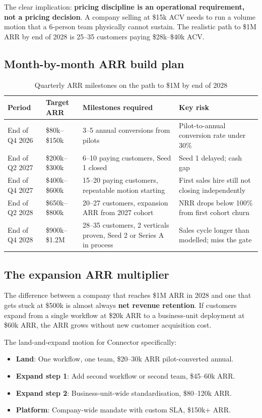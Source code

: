 The clear implication: \textbf{pricing discipline is an operational requirement,
not a pricing decision}. A company selling at \$15k ACV needs to run a volume
motion that a 6-person team physically cannot sustain. The realistic path to
\$1M ARR by end of 2028 is 25--35 customers paying \$28k--\$40k ACV.

\subsection{Month-by-month ARR build plan}

\begin{table}[H]
\centering
\renewcommand{\arraystretch}{1.45}
\begin{tabularx}{\textwidth}{@{}lXXX@{}}
\toprule
\textbf{Period} & \textbf{Target ARR} & \textbf{Milestones required} & \textbf{Key risk} \\
\midrule
End of Q4 2026 & \$80k--\$150k & 3--5 annual conversions from pilots & Pilot-to-annual conversion rate under 30\% \\
End of Q2 2027 & \$200k--\$300k & 6--10 paying customers, Seed 1 closed & Seed 1 delayed; cash gap \\
End of Q4 2027 & \$400k--\$600k & 15--20 paying customers, repeatable motion starting & First sales hire still not closing independently \\
End of Q2 2028 & \$650k--\$800k & 20--27 customers, expansion ARR from 2027 cohort & NRR drops below 100\% from first cohort churn \\
End of Q4 2028 & \$900k--\$1.2M & 28--35 customers, 2 verticals proven, Seed 2 or Series A in process & Sales cycle longer than modelled; miss the gate \\
\bottomrule
\end{tabularx}
\caption{Quarterly ARR milestones on the path to \$1M by end of 2028}
\end{table}

\subsection{The expansion ARR multiplier}

The difference between a company that reaches \$1M ARR in 2028 and one that
gets stuck at \$500k is almost always \textbf{net revenue retention}. If
customers expand from a single workflow at \$20k ARR to a business-unit
deployment at \$60k ARR, the ARR grows without new customer acquisition cost.

The land-and-expand motion for Connector specifically:
\begin{itemize}[leftmargin=1.5em,itemsep=3pt]
  \item \textbf{Land}: One workflow, one team, \$20--30k ARR pilot-converted annual.
  \item \textbf{Expand step 1}: Add second workflow or second team, \$45--60k ARR.
  \item \textbf{Expand step 2}: Business-unit-wide standardisation, \$80--120k ARR.
  \item \textbf{Platform}: Company-wide mandate with custom SLA, \$150k+ ARR.
\end{itemize}

